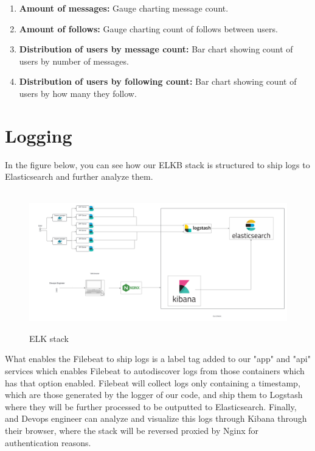 \documentclass[12pt, a4paper, oneside]{book}
\begin{document}
\begin{spacing}{1.5}
\begin{enumerate}
    \item \textbf{Amount of messages:}
    Gauge charting message count.    
    \item \textbf{Amount of follows:}
    Gauge charting count of follows between users.
    
    \item \textbf{Distribution of users by message count:}
    Bar chart showing count of users by number of messages.
    \item \textbf{Distribution of users by following count:}
    Bar chart showing count of users by how many they follow.
\end{enumerate}



\section{Logging}
In the figure below, you can see how our ELKB stack is structured to ship logs to Elasticsearch and further analyze them.
\begin{figure}[H]
    \centering
    \hbox{\hspace{-8em}
    \includegraphics[scale = 0.35]{images/elk.png}}
    \caption{ELK stack}
    \label{fig:elk-stack}
\end{figure}

What enables the Filebeat to ship logs is a label tag added to our "app" and "api" services which enables Filebeat to autodiscover logs from those containers which has that option enabled. Filebeat will collect logs only containing a timestamp, which are those generated by the logger of our code, and ship them to Logstash where they will be further processed to be outputted to Elasticsearch. Finally, and Devops engineer can analyze and visualize this logs through Kibana through their browser, where the stack will be reversed proxied by Nginx for authentication reasons. \bigskip


\end{spacing}
\end{document}
